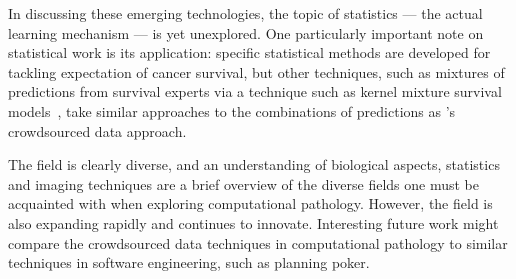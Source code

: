 \documentclass{tufte-handout}
\begin{document}
\bigskip

In discussing these emerging technologies, the topic of statistics --- the actual learning mechanism --- is yet unexplored. One particularly important note on statistical work is its application: specific statistical methods are developed for tackling expectation of cancer survival, but other techniques, such as mixtures of predictions from survival experts via a technique such as kernel mixture survival models~\cite{Ando2004}, take similar approaches to the combinations of predictions as \cite{dekel2009vox}'s crowdsourced data approach.\par

The field is clearly diverse, and an understanding of biological aspects, statistics and imaging techniques are a brief overview of the diverse fields one must be acquainted with when exploring computational pathology. However, the field is also expanding rapidly and continues to innovate. Interesting future work might compare the crowdsourced data techniques in computational pathology to similar techniques in software engineering, such as planning poker\cite{Grenning2002}.

\end{document}
